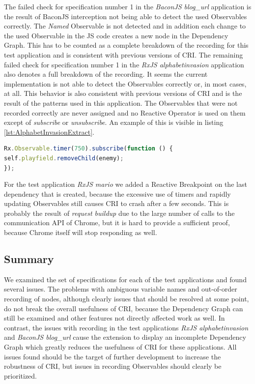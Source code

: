 The failed check for specification number 1 in the \emph{BaconJS blog\_url} application is the result of BaconJS interception not being able to detect the used Observables correctly. The \emph{Named} Observable is not detected and in addition each change to the used Observable in the JS code creates a new node in the Dependency Graph. This has to be counted as a complete breakdown of the recording for this test application and is consistent with previous versions of CRI. The remaining failed check for specification number 1 in the \emph{RxJS alphabetinvasion} application also denotes a full breakdown of the recording. It seems the current implementation is not able to detect the Observables correctly or, in most cases, at all. This behavior is also consistent with previous versions of CRI and is the result of the patterns used in this application. The Observables that were not recorded correctly are never assigned and no Reactive Operator is used on them except of \emph{subscribe} or \emph{unsubscribe}. An example of this is visible in listing \ref{lst:AlphabetInvasionExtract}.

\begin{lstlisting}[language=JavaScript, caption={Extract of RxJS AlphabetInvasion test application.},label={lst:AlphabetInvasionExtract}]
Rx.Observable.timer(750).subscribe(function () {
self.playfield.removeChild(enemy);
});	
\end{lstlisting}

For the test application \emph{RxJS mario} we added a Reactive Breakpoint on the last dependency that is created, because the excessive use of timers and rapidly updating Observables still causes CRI to crash after a few seconds. This is probably the result of \emph{request buildup} due to the large number of calls to the communication API of Chrome, but it is hard to provide a sufficient proof, because Chrome itself will stop responding as well.


\subsection{Summary}
We examined the set of specifications for each of the test applications and found several issues. The problems with ambiguous variable names and out-of-order recording of nodes, although clearly issues that should be resolved at some point, do not break the overall usefulness of CRI, because the Dependency Graph can still be examined and other features not directly affected work as well. In contrast, the issues with recording in the test applications \emph{RxJS alphabetinvasion} and \emph{BaconJS blog\_url} cause the extension to display an incomplete Dependency Graph which greatly reduces the usefulness of CRI for these applications.
All issues found should be the target of further development to increase the robustness of CRI, but issues in recording Observables should clearly be prioritized.